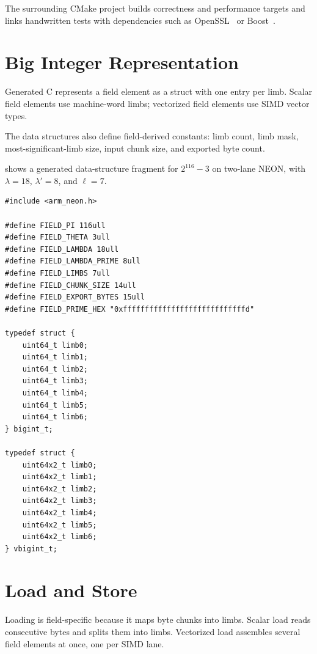 The surrounding CMake project builds correctness and performance targets and links handwritten tests with dependencies such as OpenSSL~\cite{openssl} or Boost~\cite{boost}.

\section{Big Integer Representation}
\label{sec:bigint-representation}

Generated C represents a field element as a struct with one entry per limb. Scalar field elements use machine-word limbs; vectorized field elements use SIMD vector types.

The data structures also define field-derived constants: limb count, limb mask, most-significant-limb size, input chunk size, and exported byte count.

 shows a generated data-structure fragment for \(2^{116}-3\) on two-lane NEON, with \(\lambda=18\), \(\lambda'=8\), and \(\ell=7\).

\begin{lstlisting}[style=thesisC,basicstyle=\scriptsize\ttfamily,caption={Generated scalar and vectorized field-element data structures.},label={lst:generated-structs}]
#include <arm_neon.h>

#define FIELD_PI 116ull
#define FIELD_THETA 3ull
#define FIELD_LAMBDA 18ull
#define FIELD_LAMBDA_PRIME 8ull
#define FIELD_LIMBS 7ull
#define FIELD_CHUNK_SIZE 14ull
#define FIELD_EXPORT_BYTES 15ull
#define FIELD_PRIME_HEX "0xffffffffffffffffffffffffffffd"

typedef struct {
    uint64_t limb0;
    uint64_t limb1;
    uint64_t limb2;
    uint64_t limb3;
    uint64_t limb4;
    uint64_t limb5;
    uint64_t limb6;
} bigint_t;

typedef struct {
    uint64x2_t limb0;
    uint64x2_t limb1;
    uint64x2_t limb2;
    uint64x2_t limb3;
    uint64x2_t limb4;
    uint64x2_t limb5;
    uint64x2_t limb6;
} vbigint_t;
\end{lstlisting}

\section{Load and Store}
\label{sec:load-store}

Loading is field-specific because it maps byte chunks into limbs. Scalar load reads consecutive bytes and splits them into limbs. Vectorized load assembles several field elements at once, one per SIMD lane.

